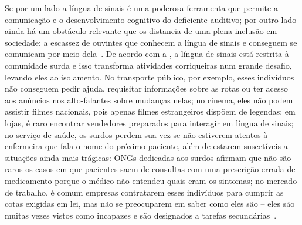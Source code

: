 

Se por um lado a língua de sinais é uma poderosa ferramenta que permite a comunicação e o desenvolvimento cognitivo do deficiente auditivo; por outro lado ainda há um obstáculo relevante que os distancia de uma plena inclusão em sociedade: a escassez de ouvintes que conhecem a língua de sinais e conseguem se comunicam por meio dela~\cite{bragg-2019-slr-interdisciplinary}. De acordo com a \citeauthor{senado-2019-baixo-alcance-lingua-sinais}, a língua de sinais está restrita à comunidade surda e isso transforma atividades corriqueiras num grande desafio, levando eles ao isolamento. No transporte público, por exemplo, esses indivíduos não conseguem pedir ajuda, requisitar informações sobre as rotas ou ter acesso aos anúncios nos alto-falantes sobre mudanças nelas; no cinema, eles não podem assistir filmes nacionais, pois apenas filmes estrangeiros dispõem de legendas; em lojas, é raro encontrar vendedores preparados para interagir em língua de sinais; no serviço de saúde, os surdos perdem sua vez se não estiverem atentos à enfermeira que fala o nome do próximo paciente, além de estarem suscetíveis a situações ainda mais trágicas: ONGs dedicadas aos surdos afirmam que não são raros os casos em que pacientes saem de consultas com uma prescrição errada de medicamento porque o médico não entendeu quais eram os sintomas; no mercado de trabalho, é comum empresas contratarem esses indivíduos para cumprir as cotas exigidas em lei, mas não se preocuparem em saber como eles são -- eles são muitas vezes vistos como incapazes e são designados a tarefas secundárias~\cite{senado-2019-baixo-alcance-lingua-sinais}.


